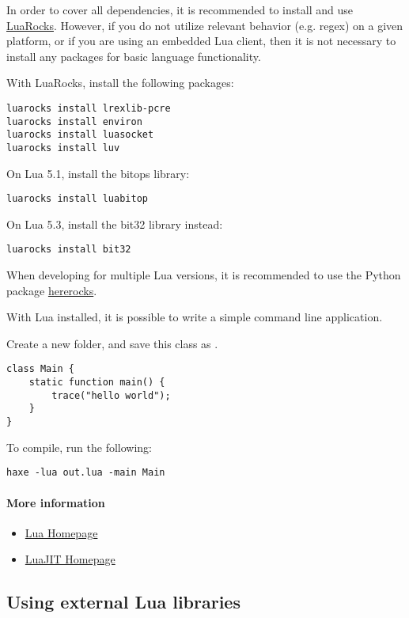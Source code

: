 In order to cover all dependencies, it is recommended to install and use
\href{https://github.com/luarocks/luarocks/wiki/Download}{LuaRocks}.  However,
if you do not utilize relevant behavior (e.g. regex) on a given platform,
or if you are using an embedded Lua client, then it is not necessary to
install any packages for basic language functionality.

With LuaRocks, install the following packages:

\begin{lstlisting}
luarocks install lrexlib-pcre
luarocks install environ
luarocks install luasocket
luarocks install luv
\end{lstlisting}

On Lua 5.1, install the bitops library:
\begin{lstlisting}
luarocks install luabitop
\end{lstlisting}

On Lua 5.3, install the bit32 library instead:
\begin{lstlisting}
luarocks install bit32
\end{lstlisting}

When developing for multiple Lua versions, it is recommended to use
the Python package \href{https://github.com/mpeterv/hererocks}{hererocks}.

With Lua installed, it is possible to write a simple command line application.

Create a new folder, and save this class as .

\begin{lstlisting}
class Main {
    static function main() {
        trace("hello world");
    }
}
\end{lstlisting}

To compile, run the following:
\begin{lstlisting}
haxe -lua out.lua -main Main
\end{lstlisting}

\paragraph{More information}
\begin{itemize}
	\item \href{https://www.lua.org/}{Lua Homepage}
	\item \href{http://luajit.org/}{LuaJIT Homepage}
\end{itemize}

\subsection{Using external Lua libraries}
\label{target-lua-external-libraries}


